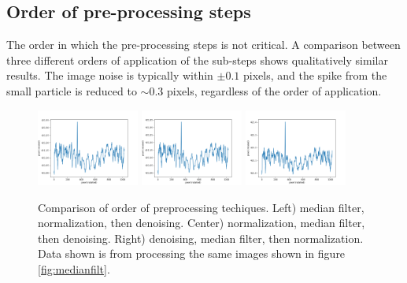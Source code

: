 \subsection{Order of pre-processing steps}
\par
The order in which the pre-processing steps is not critical.
A comparison between three different orders of application of the sub-steps shows qualitatively similar results.
The image noise is typically within $\pm 0.1$ pixels, and the spike from the small particle is reduced to $\sim 0.3$ pixels, regardless of the order of application.
%
\begin{figure}[H]
	\centering
	\includegraphics[width=0.3\textwidth]{../images/particle-example-1-median-normalized-denoised.png}
	\includegraphics[width=0.3\textwidth]{../images/particle-example-1-normalized-median-denoised.png}
	\includegraphics[width=0.3\textwidth]{../images/particle-example-1-denoised-median-normalized.png}
	\caption{Comparison of order of preprocessing techiques. Left) median filter, normalization, then denoising. Center) normalization, median filter, then denoising. Right) denoising, median filter, then normalization. Data shown is from processing the same images shown in figure \ref{fig:medianfilt}.}
\end{figure}
%
